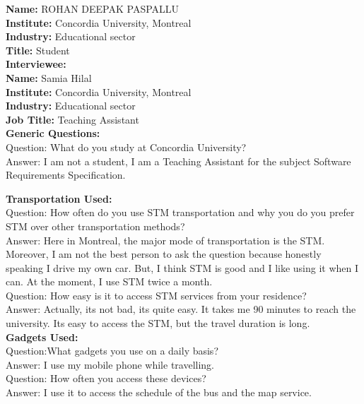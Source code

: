 \documentclass[11pt, english]{report}
\begin{document}
\textbf{Name:} ROHAN DEEPAK PASPALLU \\
\textbf{Institute:} Concordia University, Montreal \\
\textbf{Industry:} Educational sector\\
\textbf{Title:} Student \\ 

\textbf{Interviewee:}\\

\textbf{Name:} Samia Hilal \\
\textbf{Institute:} Concordia University, Montreal \\
\textbf{Industry:} Educational sector\\
\textbf{Job Title:} Teaching Assistant\\ 


\textbf{Generic Questions:}\\

Question: What do you study at Concordia University? \\
Answer: I am not a student, I am a Teaching Assistant for the subject Software Requirements Specification.

\textbf{Transportation Used:}\\

Question: How often do you use STM transportation and why you do you prefer STM over other transportation methods?\\
Answer: Here in Montreal, the major mode of transportation is the STM. Moreover, I am not the best person to ask the question because honestly speaking I drive my own car. But, I think STM is good and I like using it when I can. At the moment, I use STM twice a month.\\

Question: How easy is it to access STM services from your residence?\\
Answer: Actually, its not bad, its quite easy. It takes me 90 minutes to reach the university. Its easy to access the STM, but the travel duration is long.\\

\textbf{Gadgets Used:}\\

Question:What gadgets you use on a daily basis?\\
Answer: I use my mobile phone while travelling.\\

Question: How often you access these devices?\\
Answer: I use it to access the schedule of the bus and the map service.\\
\end{document}
